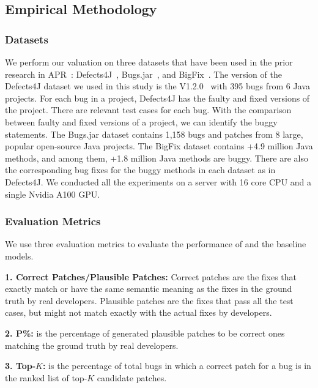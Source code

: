 \subsection{Empirical Methodology}

\subsubsection{Datasets}
We perform our valuation on three datasets that have been used
in the prior research in APR~\cite{icse20}:
Defects4J~\cite{defects4j}, Bugs.jar~\cite{saha2018bugs}, and
BigFix~\cite{yioopsla19}. The version of the Defects4J dataset we used
in this study is the V1.2.0~\cite{defects4j} with 395 bugs
from 6 Java projects. For each bug in a project, Defects4J has the
faulty and fixed versions of the project. There are relevant test
cases for each bug. With the  comparison between faulty and
fixed versions of a project, we can identify the buggy statements. The
Bugs.jar dataset contains 1,158 bugs and patches from 8 large, popular
open-source Java projects. The BigFix dataset contains +4.9 million
Java methods, and among them, +1.8 million Java methods are
buggy. There are also the corresponding bug fixes for the buggy
methods in each dataset as in Defects4J. We conducted all the
experiments on a server with 16 core CPU and a single Nvidia A100 GPU.

\subsubsection{Evaluation Metrics}

We use three evaluation metrics to evaluate the performance of \tool
and the baseline models.

{\bf 1. Correct Patches/Plausible Patches:} Correct patches are the
fixes that exactly match or have the same semantic meaning as the
fixes in the ground truth by real developers. Plausible patches are
the fixes that pass all the test cases, but might not match exactly
with the actual fixes by developers.

{\bf 2. P\%:} is the percentage of generated plausible patches to
be correct ones matching the ground truth by real developers.

{\bf 3. Top-$K$:} is the percentage of total bugs in which a correct
patch for a bug is in the ranked list of top-$K$ candidate patches.

